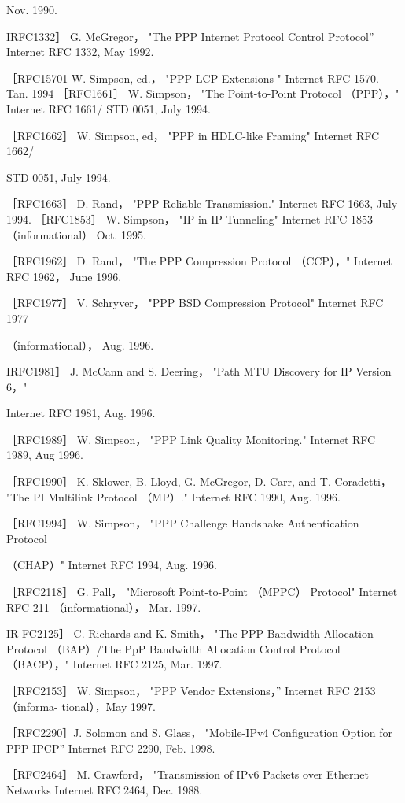 Nov. 1990.

IRFC1332］ G. McGregor， "The PPP Internet Protocol Control Protocol” Internet
RFC 1332, May 1992.

［RFC15701 W. Simpson, ed.， "PPP LCP Extensions " Internet RFC 1570. Tan. 1994
［RFC1661］ W. Simpson， "The Point-to-Point Protocol （PPP），" Internet RFC 1661/
STD 0051, July 1994.

［RFC1662］ W. Simpson, ed， "PPP in HDLC-like Framing" Internet RFC 1662/

STD 0051, July 1994.

［RFC1663］ D. Rand， "PPP Reliable Transmission." Internet RFC 1663, July 1994.
［RFC1853］ W. Simpson， "IP in IP Tunneling" Internet RFC 1853 （informational）
Oct. 1995.

［RFC1962］ D. Rand， "The PPP Compression Protocol （CCP），" Internet RFC 1962，
June 1996.

［RFC1977］ V. Schryver， "PPP BSD Compression Protocol" Internet RFC 1977

（informational）， Aug. 1996.

IRFC1981］ J. McCann and S. Deering， "Path MTU Discovery for IP Version 6，"

Internet RFC 1981, Aug. 1996.

［RFC1989］ W. Simpson， "PPP Link Quality Monitoring." Internet RFC 1989, Aug
1996.

［RFC1990］ K. Sklower, B. Lloyd, G. McGregor, D. Carr, and T. Coradetti， "The PI
Multilink Protocol （MP）." Internet RFC 1990, Aug. 1996.

［RFC1994］ W. Simpson， "PPP Challenge Handshake Authentication Protocol

（CHAP）" Internet RFC 1994, Aug. 1996.

［RFC2118］ G. Pall， "Microsoft Point-to-Point （MPPC） Protocol" Internet RFC 211
（informational）， Mar. 1997.

IR FC2125］ C. Richards and K. Smith， "The PPP Bandwidth Allocation Protocol
（BAP）/The PpP Bandwidth Allocation Control Protocol （BACP），" Internet RFC
2125, Mar. 1997.

［RFC2153］ W. Simpson， "PPP Vendor Extensions，” Internet RFC 2153 （informa-
tional），May 1997.

［RFC2290］J. Solomon and S. Glass， "Mobile-IPv4 Configuration Option for PPP
IPCP” Internet RFC 2290, Feb. 1998.

［RFC2464］ M. Crawford， "Transmission of IPv6 Packets over Ethernet Networks
Internet RFC 2464, Dec. 1988.

